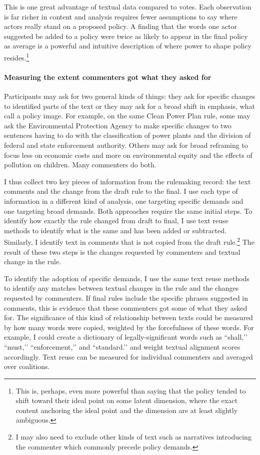This is one great advantage of textual data compared to votes. Each observation is far richer in content and analysis requires fewer assumptions to say where actors really stand on a proposed policy. A finding that the words one actor suggested be added to a policy were twice as likely to appear in the final policy as average is a powerful and intuitive description of where power to shape policy resides.\footnote{This is, perhaps, even more powerful than saying that the policy tended to shift toward their ideal point on some latent dimension, where the exact content anchoring the ideal point and the dimension are at least slightly ambiguous.}

\paragraph{Measuring the extent commenters got what they asked for}

Participants may ask for two general kinds of things: they ask for specific changes to identified parts of the text or they may ask for a broad shift in emphasis, what \citet{Jones2005} call a policy image. For example, on the same Clean Power Plan rule, some may ask the Environmental Protection Agency to make specific changes to two sentences having to do with the classification of power plants and the division of federal and state enforcement authority. Others may ask for broad reframing to focus less on economic costs and more on environmental equity and the effects of pollution on children. Many commenters do both. 

I thus collect two key pieces of information from the rulemaking record: the text comments and the change from the draft rule to the final. I use each type of information in a different kind of analysis, one targeting specific demands and one targeting broad demands. Both approaches require the same initial steps. To identify how exactly the rule changed from draft to final, I use text reuse methods to identify what is the same and has been added or subtracted. Similarly, I identify text in comments that is not copied from the draft rule.\footnote{I may also need to exclude other kinds of text such as narratives introducing the commenter which commonly precede policy demands.} The result of these two steps is the changes requested by commenters and textual change in the rule. 

To identify the adoption of specific demands, I use the same text reuse methods to identify any matches between textual changes in the rule and the changes requested by commenters. If final rules include the specific phrases suggested in comments, this is evidence that these commenters got some of what they asked for. The significance of this kind of relationship between texts could be measured by how many words were copied, weighted by the forcefulness of these words. For example, I could create a dictionary of legally-significant words such as ``shall,’’ ``must,’’ ``enforcement,’’ and ``standard.’’ and weight textual alignment scores accordingly. Text reuse can be measured for individual commenters and averaged over coalitions. 

